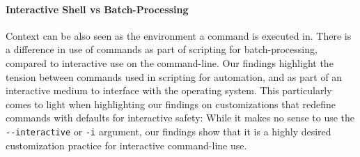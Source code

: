 \paragraph{\bf Interactive Shell vs Batch-Processing}

Context can be also seen as the environment a command is executed in. 
There is a difference in use of commands as part of scripting for batch-processing, compared to interactive use on the command-line.
Our findings highlight the tension between commands used in scripting for automation, and as part of an interactive medium to interface with the operating system.
This particularly comes to light when highlighting our findings on customizations that redefine commands with defaults for interactive safety:
While it makes no sense to use the \verb|--interactive| or \verb|-i| argument, our findings show that it is a highly desired customization practice for interactive command-line use.
